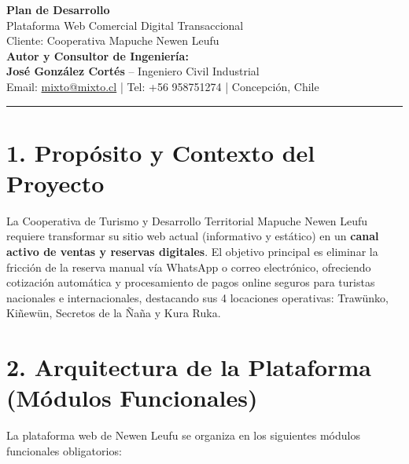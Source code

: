 \documentclass[11pt,a4paper]{article}
\begin{document}
\begin{center}
    {\Huge \bfseries Plan de Desarrollo}\\[0.5cm]
    {\LARGE \textcolor{greennewen}{Plataforma Web Comercial Digital Transaccional}}\\[0.2cm]
    {\Large Cliente: Cooperativa Mapuche Newen Leufu}\\[0.8cm]
    
    \textbf{Autor y Consultor de Ingeniería:}\\
    \textbf{José González Cortés} -- Ingeniero Civil Industrial\\
    Email: \href{mailto:mixto@mixto.cl}{mixto@mixto.cl} | Tel: +56 958751274 | Concepción, Chile\\[0.5cm]
    \rule{\textwidth}{0.5pt}
\end{center}

\vspace{0.3cm}

\section{1. Propósito y Contexto del Proyecto}
La Cooperativa de Turismo y Desarrollo Territorial Mapuche Newen Leufu requiere transformar su sitio web actual (informativo y estático) en un \textbf{canal activo de ventas y reservas digitales}. El objetivo principal es eliminar la fricción de la reserva manual vía WhatsApp o correo electrónico, ofreciendo cotización automática y procesamiento de pagos online seguros para turistas nacionales e internacionales, destacando sus 4 locaciones operativas: Trawünko, Kiñewün, Secretos de la Ñaña y Kura Ruka.

\section{2. Arquitectura de la Plataforma (Módulos Funcionales)}
La plataforma web de Newen Leufu se organiza en los siguientes módulos funcionales obligatorios:
\end{document}
